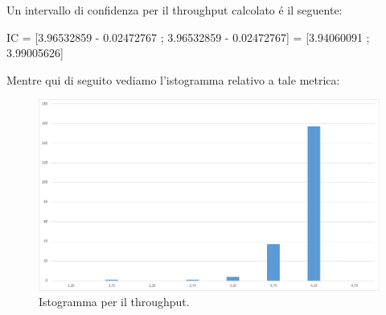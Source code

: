 Un intervallo di confidenza per il throughput calcolato \'e il seguente:

\begin{center} IC = [3.96532859 - 0.02472767 ; 3.96532859 - 0.02472767] =  [3.94060091 ; 3.99005626]\end{center}

Mentre qui di seguito vediamo l'istogramma relativo a tale metrica:
\begin{figure}[H]
	\begin{center}
	\includegraphics[scale=0.4]{img/histogram.png}
	\caption[Istogramma per il throughput]{Istogramma per il throughput.}
	\label{fig:exp_t_sess}
	\end{center}
\end{figure}

